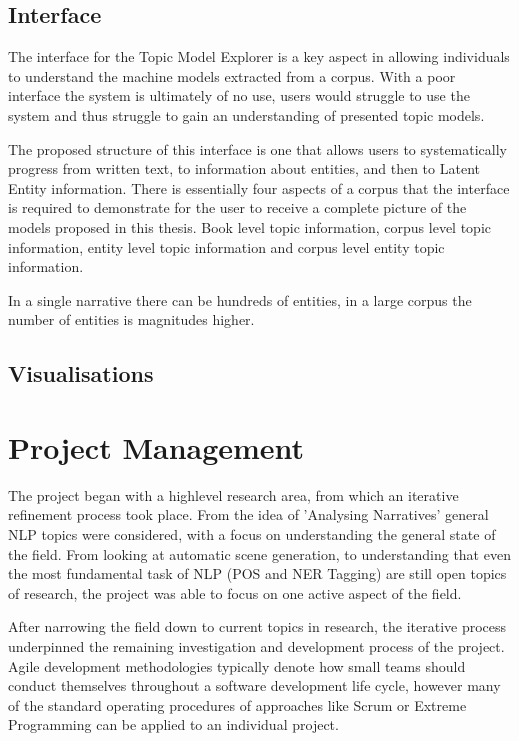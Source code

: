 \documentclass[10pt]{report}
\begin{document}
\subsection{Interface}

The interface for the Topic Model Explorer is a key aspect in allowing individuals to understand the machine models extracted from a corpus. With a poor interface the system is ultimately of no use, users would struggle to use the system and thus struggle to gain an understanding of presented topic models.

The proposed structure of this interface is one that allows users to systematically progress from written text, to information about entities, and then to Latent Entity information. There is essentially four aspects of a corpus that the interface is required to demonstrate for the user to receive a complete picture of the models proposed in this thesis. Book level topic information, corpus level topic information, entity level topic information and corpus level entity topic information.

In a single narrative there can be hundreds of entities, in a large corpus the number of entities is magnitudes higher. 

\subsection{Visualisations}

\section{Project Management}
The project began with a highlevel research area, from which an iterative refinement process took place. From the idea of 'Analysing Narratives' general NLP topics were considered, with a focus on understanding the general state of the field. From looking at automatic scene generation, to understanding that even the most fundamental task of NLP (POS and NER Tagging) are still open topics of research, the project was able to focus on one active aspect of the field.

After narrowing the field down to current topics in research, the iterative process underpinned the remaining investigation and development process of the project. Agile development methodologies typically denote how small teams should conduct themselves throughout a software development life cycle, however many of the standard operating procedures of approaches like Scrum or Extreme Programming can be applied to an individual project.
\end{document}
